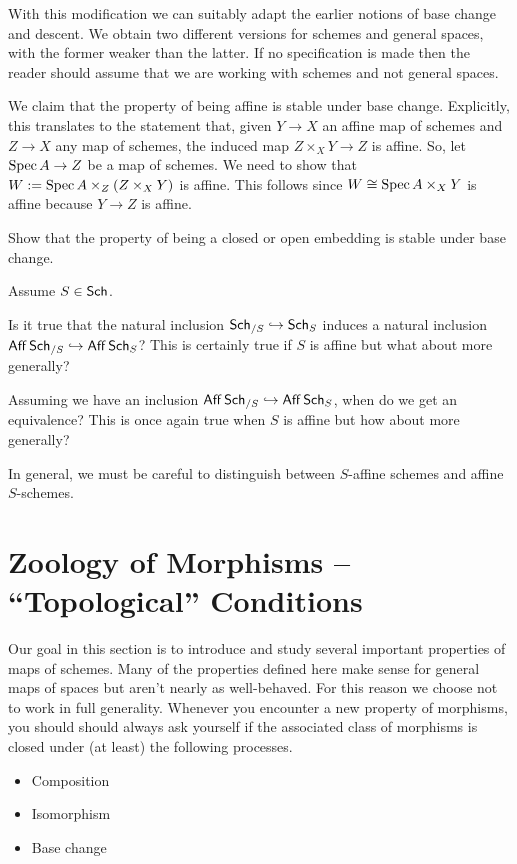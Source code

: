 \documentclass[11pt]{article}
\begin{document}
With this modification we can suitably adapt the earlier notions of base change and descent. We obtain two different versions for schemes and general spaces, with the former weaker than the latter. If no specification is made then the reader should assume that we are working with schemes and not general spaces.

\begin{example}
We claim that the property of being affine is stable under base change. Explicitly, this translates to the statement that, given $Y\to X$ an affine map of schemes and $Z\to X$ any map of schemes, the induced map $Z\times_XY\to Z$ is affine. So, let $\operatorname{Spec} A\to Z$ be a map of schemes. We need to show that $W:=\operatorname{Spec} A\times_Z(Z\times_XY)$ is affine. This follows since $W\cong\operatorname{Spec} A\times_XY$ is affine because $Y\to Z$ is affine.
\end{example}

\begin{exercise}
Show that the property of being a closed or open embedding is stable under base change.
\end{exercise}

\begin{exercise}
Assume $S\in\operatorname{\mathsf{Sch}}$. 
\begin{enum}{\alph}
\item Is it true that the natural inclusion $\operatorname{\mathsf{Sch}}_{/S}\hookrightarrow\operatorname{\mathsf{Sch}}_S$ induces a natural inclusion $\operatorname{\mathsf{Aff}}\operatorname{\mathsf{Sch}}_{/S}\hookrightarrow\operatorname{\mathsf{Aff}}\operatorname{\mathsf{Sch}}_S$? This is certainly true if $S$ is affine but what about more generally?

\item Assuming we have an inclusion $\operatorname{\mathsf{Aff}}\operatorname{\mathsf{Sch}}_{/S}\hookrightarrow\operatorname{\mathsf{Aff}}\operatorname{\mathsf{Sch}}_S$, when do we get an equivalence? This is once again true when $S$ is affine but how about more generally?
\end{enum}
\end{exercise}

In general, we must be careful to distinguish between $S$-affine schemes and affine $S$-schemes.

\section{Zoology of Morphisms -- ``Topological'' Conditions}
Our goal in this section is to introduce and study several important properties of maps of schemes. Many of the properties defined here make sense for general maps of spaces but aren't nearly as well-behaved. For this reason we choose not to work in full generality. Whenever you encounter a new property of morphisms, you should should always ask yourself if the associated class of morphisms is closed under (at least) the following processes.
\begin{itemize}
\item Composition

\item Isomorphism

\item Base change
\end{itemize}
\end{document}
